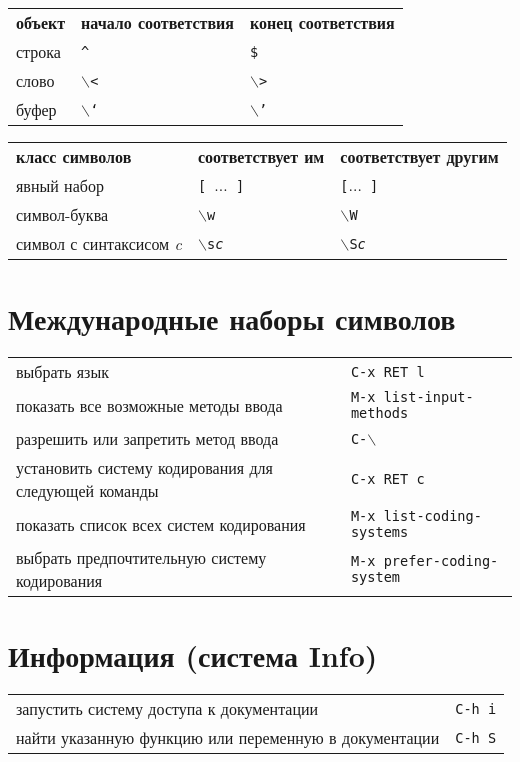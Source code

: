 \documentclass[10pt]{article}
\newlength{\ColWidth}
\newlength{\ColThreeWidth}
\newcommand{\kbd}[1]{\texttt{#1}}
\begin{document}
\begin{tabular}{p{\ColWidth}p{\ColThreeWidth}p{\ColThreeWidth}}
{\bf объект} & {\bf начало соответствия} & {\bf конец соответствия} \\
строка & \kbd{\^} & \kbd{\$} \\
слово & \kbd{$\backslash$<} & \kbd{$\backslash$>} \\
буфер & \kbd{$\backslash$`} & \kbd{$\backslash$'} \\
\end{tabular}

\begin{tabular}{p{\ColWidth}p{\ColThreeWidth}p{\ColThreeWidth}}
{\bf класс символов} & {\bf соответ\-ствует им} & {\bf соответ\-ствует другим} \\
явный набор & \kbd{[ {\rm$\ldots$} ]} & \kbd{[\^ {\rm$\ldots$} ]} \\
символ-буква & \kbd{$\backslash$w} & \kbd{$\backslash$W} \\
символ с синтаксисом {\it c} & \kbd{$\backslash$s{\it c}} & \kbd{$\backslash$S{\it c}} \\
\end{tabular}

\section{Международные наборы символов}

\begin{tabular}{p{\ColWidth}l}
выбрать язык & \kbd{C-x RET l} \\
показать все возможные методы ввода & \kbd{M-x list-input-methods} \\
разрешить или запретить метод ввода & \kbd{C-$\backslash$} \\
установить систему кодирования для следующей команды & \kbd{C-x RET c} \\
показать список всех систем кодирования & \kbd{M-x list-coding-systems} \\
выбрать предпочтительную систему кодирования & \kbd{M-x prefer-coding-system} \\
\end{tabular}

\section{Информация (система Info)}

\begin{tabular}{p{\ColWidth}l}
запустить систему доступа к документации & \kbd{C-h i} \\
найти указанную функцию или переменную в документации & \kbd{C-h S} \\
\end{tabular}
\end{document}
